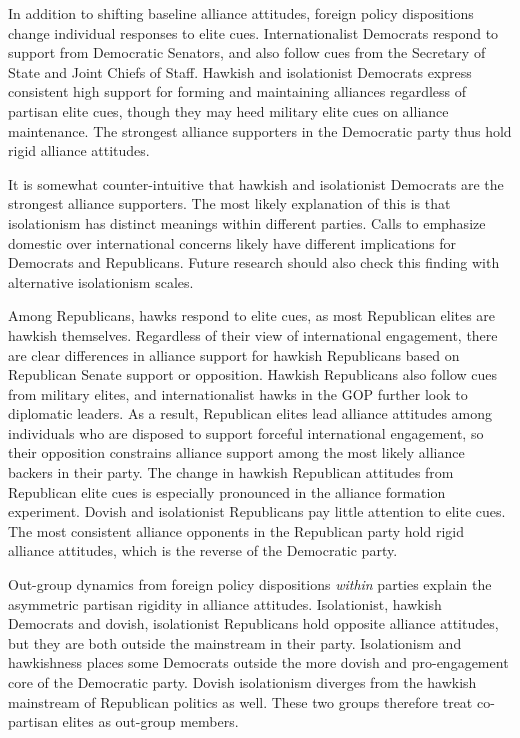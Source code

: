 \documentclass[12pt]{article}
\begin{document}
In addition to shifting baseline alliance attitudes, foreign policy dispositions change individual responses to elite cues. 
Internationalist Democrats respond to support from Democratic Senators, and also follow cues from the Secretary of State and Joint Chiefs of Staff. 
Hawkish and isolationist Democrats express consistent high support for forming and maintaining alliances regardless of partisan elite cues, though they may heed military elite cues on alliance maintenance. 
The strongest alliance supporters in the Democratic party thus hold rigid alliance attitudes.


It is somewhat counter-intuitive that hawkish and isolationist Democrats are the strongest alliance supporters. 
The most likely explanation of this is that isolationism has distinct meanings within different parties.
Calls to emphasize domestic over international concerns likely have different implications for Democrats and Republicans.
Future research should also check this finding with alternative isolationism scales. 


Among Republicans, hawks respond to elite cues, as most Republican elites are hawkish themselves. 
Regardless of their view of international engagement, there are clear differences in alliance support for hawkish Republicans based on Republican Senate support or opposition.
Hawkish Republicans also follow cues from military elites, and internationalist hawks in the GOP further look to diplomatic leaders. 
As a result, Republican elites lead alliance attitudes among individuals who are disposed to support forceful international engagement, so their opposition constrains alliance support among the most likely alliance backers in their party. 
The change in hawkish Republican attitudes from Republican elite cues is especially pronounced in the alliance formation experiment. 
Dovish and isolationist Republicans pay little attention to elite cues. 
The most consistent alliance opponents in the Republican party hold rigid alliance attitudes, which is the reverse of the Democratic party. 


Out-group dynamics from foreign policy dispositions \textit{within} parties explain the asymmetric partisan rigidity in alliance attitudes. 
Isolationist, hawkish Democrats and dovish, isolationist Republicans hold opposite alliance attitudes, but they are both outside the mainstream in their party.
Isolationism and hawkishness places some Democrats outside the more dovish and pro-engagement core of the Democratic party. 
Dovish isolationism diverges from the hawkish mainstream of Republican politics as well. 
These two groups therefore treat co-partisan elites as out-group members.  
\end{document}

